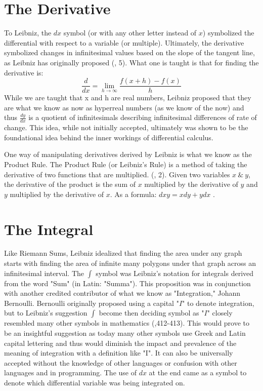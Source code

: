 \documentclass[12pt]{report}
\begin{document}
    \section*{The Derivative}
To Leibniz, the $dx$ symbol (or with any other letter instead of $x$) symbolized the differential with respect to a variable (or multiple).
Ultimately, the derivative symbolized changes in infinitesimal values based on the slope of the tangent line, as Leibniz has originally proposed (, 5).
What one is taught is that for finding the derivative is: \[\frac{d}{dx} = \lim_{h \xrightarrow{} \infty} \frac{f(x+h)-f(x)}{h}\] While we are taught that x and h are real numbers, Leibniz proposed that they are what we know as now as hyperreal numbers (as we know of the now) and thus $\frac{dy}{dx}$  is a quotient of infinitesimals describing infinitesimal differences of rate of change.
This idea, while not initially accepted, ultimately was shown to be the foundational idea behind the inner workings of differential calculus.\\ \par
    One way of manipulating derivatives derived by Leibniz is what we know as the Product Rule.
The Product Rule (or Leibniz's Rule) is a method of taking the derivative of two functions that are multiplied. (\citeauthor{Leibniz}, 2).
Given two variables $x \ \& \  y$, the derivative of the product is the sum of $x$ multiplied by the derivative of $y$ and $y$ multiplied by the derivative of $x$. As a formula:  $dxy=xdy+ydx$ .

    \section*{The Integral}
Like Riemann Sums, Leibniz idealized that finding the area under any graph starts with finding the area of infinite many polygons under that graph across an infinitesimal interval. 
The $\int$ symbol was Leibniz's notation for integrals derived from the word "Sum" (in Latin: "Summa"). 
This proposition was in conjunction with another credited contributor of what we know as "Integration," Johann Bernoulli. 
Bernoulli originally proposed using a capital "$I$" to denote integration, but to Leibniz's suggestion $\int$ become then deciding symbol as "$I$" closely resembled many other symbols in mathematics (\citeauthor{Cajori},412-413).
This would prove to be an insightful suggestion as today many other symbols use Greek and Latin capital lettering and thus would diminish the impact and prevalence of the meaning of integration with a definition like "I". It can also be universally accepted without the knowledge of other languages or confusion with other languages and in programming.  
The use of $dx$ at the end came as a symbol to denote which differential variable was being integrated on.
    
\end{document}
